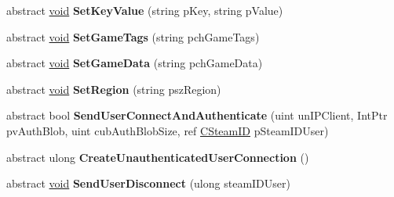 \begin{DoxyCompactItemize}
\item 
\hypertarget{classValve_1_1Steamworks_1_1ISteamGameServer_a3ae51aa9aa6d9e9783e0fdbfb7dca833}{}abstract \hyperlink{SDL__audio_8h_a52835ae37c4bb905b903cbaf5d04b05f}{void} {\bfseries Set\+Key\+Value} (string p\+Key, string p\+Value)\label{classValve_1_1Steamworks_1_1ISteamGameServer_a3ae51aa9aa6d9e9783e0fdbfb7dca833}

\item 
\hypertarget{classValve_1_1Steamworks_1_1ISteamGameServer_a339cc816eba2a6c7d3713904097644d5}{}abstract \hyperlink{SDL__audio_8h_a52835ae37c4bb905b903cbaf5d04b05f}{void} {\bfseries Set\+Game\+Tags} (string pch\+Game\+Tags)\label{classValve_1_1Steamworks_1_1ISteamGameServer_a339cc816eba2a6c7d3713904097644d5}

\item 
\hypertarget{classValve_1_1Steamworks_1_1ISteamGameServer_a87617ebd5d15adbee0427aec449ba317}{}abstract \hyperlink{SDL__audio_8h_a52835ae37c4bb905b903cbaf5d04b05f}{void} {\bfseries Set\+Game\+Data} (string pch\+Game\+Data)\label{classValve_1_1Steamworks_1_1ISteamGameServer_a87617ebd5d15adbee0427aec449ba317}

\item 
\hypertarget{classValve_1_1Steamworks_1_1ISteamGameServer_a0f86e87d03a12fdd1e27fca7cf3c0885}{}abstract \hyperlink{SDL__audio_8h_a52835ae37c4bb905b903cbaf5d04b05f}{void} {\bfseries Set\+Region} (string psz\+Region)\label{classValve_1_1Steamworks_1_1ISteamGameServer_a0f86e87d03a12fdd1e27fca7cf3c0885}

\item 
\hypertarget{classValve_1_1Steamworks_1_1ISteamGameServer_a6fd967636be23d9b0240f09da57e4293}{}abstract bool {\bfseries Send\+User\+Connect\+And\+Authenticate} (uint un\+I\+P\+Client, Int\+Ptr pv\+Auth\+Blob, uint cub\+Auth\+Blob\+Size, ref \hyperlink{structValve_1_1Steamworks_1_1CSteamID}{C\+Steam\+I\+D} p\+Steam\+I\+D\+User)\label{classValve_1_1Steamworks_1_1ISteamGameServer_a6fd967636be23d9b0240f09da57e4293}

\item 
\hypertarget{classValve_1_1Steamworks_1_1ISteamGameServer_ad1c40bd0819219fda1436be8e20cea01}{}abstract ulong {\bfseries Create\+Unauthenticated\+User\+Connection} ()\label{classValve_1_1Steamworks_1_1ISteamGameServer_ad1c40bd0819219fda1436be8e20cea01}

\item 
\hypertarget{classValve_1_1Steamworks_1_1ISteamGameServer_a75bbe425dad32982e9d69507140fbcb7}{}abstract \hyperlink{SDL__audio_8h_a52835ae37c4bb905b903cbaf5d04b05f}{void} {\bfseries Send\+User\+Disconnect} (ulong steam\+I\+D\+User)\label{classValve_1_1Steamworks_1_1ISteamGameServer_a75bbe425dad32982e9d69507140fbcb7}


\end{DoxyCompactItemize}
